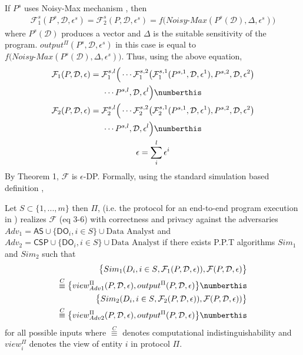{If $P^s$ uses Noisy-Max mechanism \cite{Dork}, then
\begin{multline}
\mathcal{F}^s_1(P^s,\mathcal{D},\epsilon^s)=\mathcal{F}^s_2(P,\mathcal{D},\epsilon^s)=f\big(\textit{Noisy-Max}(P^s(\mathcal{D}),\Delta,\epsilon^s)\big) 
\end{multline} where $P^s(\mathcal{D})$ produces a vector and  $\Delta$ is the suitable sensitivity of the program. $output^{\Pi}(P^s,\mathcal{D},\epsilon^s)$ in this case is equal to \\ $f\big(\textit{Noisy-Max}(P^s(\mathcal{D}),\Delta,\epsilon^s)\big)$.  Thus, using the above equation, \begin{gather*}\mathcal{F}_1(P,\mathcal{D},\epsilon)=\mathcal{F}^{s,l}_1\Big(\cdots\mathcal{F}^{s,2}_1\big(\mathcal{F}_1^{s,1}(P^{s,1},\mathcal{D},\epsilon^1),P^{s,2},\mathcal{D},\epsilon^{2}\big)\\\cdots P^{s,l},\mathcal{D},\epsilon^l\Big) \numberthis \\\mathcal{F}_2(P,\mathcal{D},\epsilon)=\mathcal{F}^{s,l}_2\Big(\cdots\mathcal{F}^{s,2}_2\big(\mathcal{F}_2^{s,1}(P^{s,1},\mathcal{D},\epsilon^1),P^{s,2},\mathcal{D},\epsilon^{2}\big)\\\cdots P^{s,l},\mathcal{D},\epsilon^l\Big) \numberthis \\\epsilon=\sum_i^l\epsilon^i\end{gather*}By Theorem 1, $\mathcal{F}$ is $\epsilon$-DP.
Formally, using the standard simulation based definition \cite{Oded},
\begin{theorem}  Let $S \subset \{1,...,m\}$ then $\Pi$, (i.e. the protocol for an end-to-end program execution in \system) realizes $\mathcal{F}$ (eq 3-6)  with correctness and privacy against
the adversaries $Adv_1=\textsf{AS} \cup \{\textsf{DO}_i, i \in S\} \cup \mbox{Data Analyst}$  and $Adv_2=\textsf{CSP} \cup  \{ \textsf{DO}_i, i \in S\} \cup \mbox{Data Analyst}$
 if there exists  P.P.T algorithms $Sim_1$ and $Sim_2$ such that  \begin{align*}
 \big\{Sim_1({D_i, i \in S},\mathcal{F}_1(P,\mathcal{D},\epsilon)),\mathcal{F}(P,\mathcal{D},\epsilon)\big\} &\\\stackrel{C}{\equiv} \big\{view^{\Pi}_{Adv1}(P,\mathcal{D},\epsilon),output^{\Pi}(P,\mathcal{D},\epsilon)\big\}  \numberthis\label{adv1}
               \\
 \big\{Sim_2({D_i, i \in S},\mathcal{F}_2(P,\mathcal{D},\epsilon)),\mathcal{F}(P,\mathcal{D},\epsilon))\big\} &\\\stackrel{C}{\equiv}\big\{ view^{\Pi}_{Adv2}(P,\mathcal{D},\epsilon),output^{\Pi}(P,\mathcal{D},\epsilon)\big\}  \numberthis\label{adv2}
\end{align*} for all possible inputs  where $ \stackrel{C}{\equiv}$ denotes computational indistinguishability and $view^{\Pi}_i$ denotes the view of entity $i$ in protocol $\Pi$. 
\end{theorem}}











